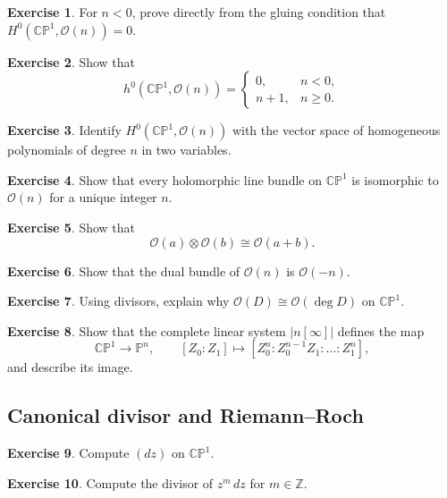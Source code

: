 \documentclass[11pt]{article}
\newcommand{\Z}{\mathbb{Z}}
\newcommand{\CP}{\mathbb{CP}}
\newcommand{\PP}{\mathbb{P}}
\newcommand{\OO}{\mathcal{O}}
\newcommand{\degd}{\operatorname{deg}}
\newcommand{\CPone}{\CP^1}
\theoremstyle{plain}
\theoremstyle{definition}
\newtheorem{exercise}{Exercise}
\begin{document}
\begin{exercise}
For $n<0$, prove directly from the gluing condition that $H^0(\CPone,\OO(n))=0$.
\end{exercise}

\begin{exercise}
Show that
\[
h^0(\CPone,\OO(n))=
\begin{cases}
0,& n<0,\\
n+1,& n\ge 0.
\end{cases}
\]
\end{exercise}

\begin{exercise}
Identify $H^0(\CPone,\OO(n))$ with the vector space of homogeneous polynomials of degree $n$ in two variables.
\end{exercise}

\begin{exercise}
Show that every holomorphic line bundle on $\CPone$ is isomorphic to $\OO(n)$ for a unique integer $n$.
\end{exercise}

\begin{exercise}
Show that
\[
\OO(a)\otimes \OO(b)\cong \OO(a+b).
\]
\end{exercise}

\begin{exercise}
Show that the dual bundle of $\OO(n)$ is $\OO(-n)$.
\end{exercise}

\begin{exercise}
Using divisors, explain why $\OO(D)\cong \OO(\degd D)$ on $\CPone$.
\end{exercise}

\begin{exercise}
Show that the complete linear system $|n[\infty]|$ defines the map
\[
\CPone\longrightarrow \PP^n,
\qquad
[Z_0:Z_1]\longmapsto [Z_0^n:Z_0^{n-1}Z_1:\dots:Z_1^n],
\]
and describe its image.
\end{exercise}

\subsection*{Canonical divisor and Riemann--Roch}
\begin{exercise}
Compute $(dz)$ on $\CPone$.
\end{exercise}

\begin{exercise}
Compute the divisor of $z^m\,dz$ for $m\in\Z$.
\end{exercise}
\end{document}
